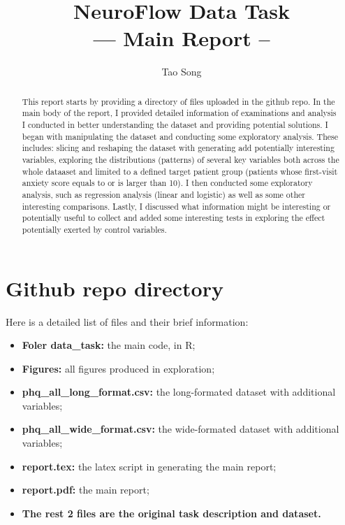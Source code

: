 \documentclass[11pt]{article}
\title{\textbf{NeuroFlow Data Task}\\
	--- Main Report --}
\author{Tao Song}
\begin{document}
 
	
	
\baselineskip24pt
	
\maketitle 
	
	
\renewcommand{\abstractname}{Introduction}
\begin{abstract}
	This report starts by providing a directory of files uploaded in the github repo. In the main body of the report, I provided detailed information of examinations and analysis I conducted in better understanding the dataset and providing potential solutions. 
	I began with manipulating the dataset and conducting some exploratory analysis. These includes: slicing and reshaping the dataset with generating add potentially interesting variables, exploring the distributions (patterns) of several key variables both across the whole dataaset and limited to a defined target patient group (patients whose first-visit anxiety score equals to or is larger than 10). I then conducted some exploratory analysis, such as regression analysis (linear and logistic) as well as some other interesting comparisons. Lastly, I discussed what information might be interesting or potentially useful to collect and added some interesting tests in exploring the effect potentially exerted by control variables. 
\end{abstract}
	
\singlespacing
\tableofcontents
	
\newpage
	
\section{Github repo directory}
	
Here is a detailed list of files and their brief information:
\begin{itemize}
	\item \textbf{Foler data\_task:} the main code, in R;
	\item \textbf{Figures:} all figures produced in exploration;
	\item \textbf{phq\_all\_long\_format.csv:} the long-formated dataset with additional variables;
	\item \textbf{phq\_all\_wide\_format.csv:} the wide-formated dataset with additional variables;
	\item \textbf{report.tex:} the latex script in generating the main report;
	\item \textbf{report.pdf:} the main report;
	\item \textbf{The rest 2 files are the original task description and dataset.}
\end{itemize}
\end{document}
